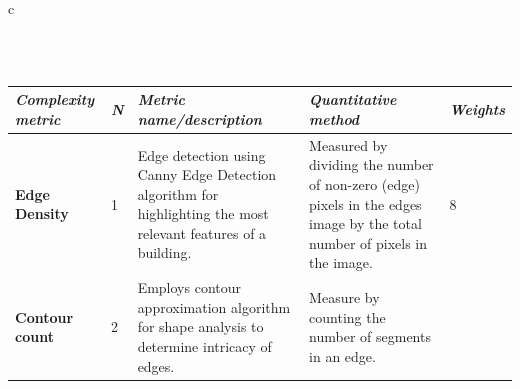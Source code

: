 \documentclass[final,5p,times]{elsarticle}%
\begin{document}
\begin{linenumbers}
\begin{table}[h!tb]
\begin{tabular}{c}
\begin{minipage}{\textwidth}
\begin{minipage}{0.49\textwidth}
                            \label{fig:CICARenderPlot}
                        \end{minipage}
                    \end{minipage}
                    \\
                    \\
                    \begin{minipage}{\textwidth}
                        \centering
                        \label{tab:MetricsandWeights}
                        \begin{tabularx}{\textwidth}{p{3.5cm} p{1cm} X X p{1cm}}
                            \toprule
                            \textit{Complexity metric} &
                              \textit{N} &
                              \textit{Metric name/description} &
                              \textit{Quantitative   method} &
                              \textit{Weights} \\ \midrule
                            \textbf{Edge Density} &
                              1 &
                              Edge detection using Canny Edge Detection algorithm for highlighting the most relevant features of a building.
                                &
                              Measured by dividing the number of non-zero (edge) pixels in the edges image by the total number of pixels in the image.
                                &
                              8\\
                            \textbf{Contour count} &
                              2 &
                              Employs contour approximation algorithm for shape analysis to determine intricacy of edges.
                                &
                              Measure by counting the number of segments in an edge.

\end{tabularx}
\end{minipage}
\end{tabular}
\end{table}
\end{linenumbers}
\end{document}
